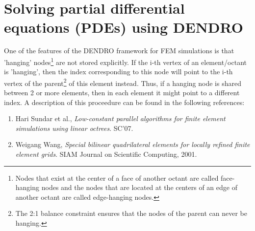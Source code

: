 \documentclass[12pt,reqno,a4paper]{report}
\numberwithin{equation}{section}
\begin{document}
\chapter{Solving partial differential equations (PDEs) using DENDRO}
\label{chp:fem}
One of the features of the DENDRO framework for FEM simulations is that 'hanging' nodes\footnote{Nodes that exist at the center of a face of another octant are called face-hanging nodes and the nodes that are located at the centers of an edge of another octant are called edge-hanging nodes.} are not stored explicitly. If the i-th vertex of an element/octant is 'hanging', then the index corresponding to this node will point to the i-th vertex of the parent\footnote{The 2:1 balance constraint ensures that the nodes of the parent can never be hanging.} of this element instead. Thus, if a hanging node is shared between 2 or more elements, then in each element it might point to a different index. A description of this proceedure can be found in the following references:
\begin{enumerate}
\item Hari Sundar et al., \textit{Low-constant parallel algorithms for finite element simulations using linear octrees}. SC'07.
\item Weigang Wang, \textit{Special bilinear quadrilateral elements for locally refined finite element grids}. SIAM Journal on Scientific Computing, 2001.
\end{enumerate}
\end{document}

